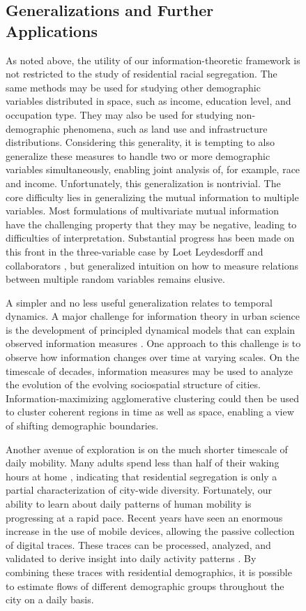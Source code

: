 \documentclass[english]{scrartcl}
\begin{document}
\begin{figure}
	\subsection*{Generalizations and Further Applications}

		As noted above, the utility of our information-theoretic framework is not restricted to the study of residential racial segregation. The same methods may be used for studying other demographic variables distributed in space, such as income, education level, and occupation type. They may also be used for studying non-demographic phenomena, such as land use and infrastructure distributions. Considering this generality, it is tempting to also generalize these measures to handle two or more demographic variables simultaneously, enabling joint analysis of, for example, race and income. Unfortunately, this generalization is nontrivial. The core difficulty lies in generalizing the mutual information to multiple variables. Most formulations of multivariate mutual information have the challenging property that they may be negative, leading to difficulties of interpretation.  Substantial progress has been made on this front in the three-variable case by Loet Leydesdorff and collaborators \cite{Leydesdorff2014,Leydesdorff2015,Leydesdorff2013}, but generalized intuition on how to measure relations between multiple random variables remains elusive. 

		A simpler and no less useful generalization relates to temporal dynamics. A major challenge for information theory in urban science is the development of principled dynamical models that can explain observed information measures \cite{Batty2014a}. One approach to this challenge is to observe how information changes over time at varying scales. On the timescale of decades, information measures may be used to analyze the evolution of the evolving sociospatial structure of cities. Information-maximizing agglomerative clustering could then be used to cluster coherent regions in time as well as space, enabling a view of shifting demographic boundaries.

		Another avenue of exploration is on the much shorter timescale of daily mobility. Many adults spend less than half of their waking hours at home \cite{BureauofLaborStati2014}, indicating that residential segregation is only a partial characterization of city-wide diversity. Fortunately, our ability to learn about daily patterns of human mobility is progressing at a rapid pace. Recent years have seen an enormous increase in the use of mobile devices, allowing the passive collection of digital traces. These traces can be processed, analyzed, and validated to derive insight into daily activity patterns \cite{Widhalm2015,Yang,Jiang2013,Jiang2012c}. By combining these traces with residential demographics, it is possible to estimate flows of different demographic groups throughout the city on a daily basis. 


\end{figure}
\end{document}
